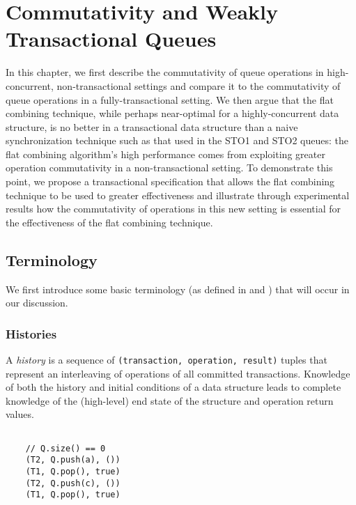 \chapter{Commutativity and Weakly Transactional Queues}
\label{commutativity}

In this chapter, we first describe the commutativity of queue operations in high-concurrent, non-transactional settings and compare it to the commutativity of queue operations in a fully-transactional setting. We then argue that the flat combining technique, while perhaps near-optimal for a highly-concurrent data structure, is no better in a transactional data structure than a naive synchronization technique such as that used in the STO1 and STO2 queues: the flat combining algorithm's high performance comes from exploiting greater operation commutativity in a non-transactional setting. To demonstrate this point, we propose a transactional specification that allows the flat combining technique to be used to greater effectiveness and illustrate through experimental results how the commutativity of operations in this new setting is essential for the effectiveness of the flat combining technique.

\section{Terminology}
We first introduce some basic terminology (as defined in \cite{schwarz} and \cite{weihl}) that will occur in our discussion.

\subsection{Histories}
\begin{defn}
    A \emph{history} is a sequence of \texttt{(transaction, operation, result)} tuples that represent an interleaving of operations of all committed transactions. Knowledge of both the history and initial conditions of a data structure leads to complete knowledge of the (high-level) end state of the structure and operation return values.

\begin{eg}
    \begin{lstlisting}
   
    // Q.size() == 0 
    (T2, Q.push(a), ())
    (T1, Q.pop(), true)
    (T2, Q.push(c), ())
    (T1, Q.pop(), true)
    \end{lstlisting}
\end{eg}

\end{defn}

